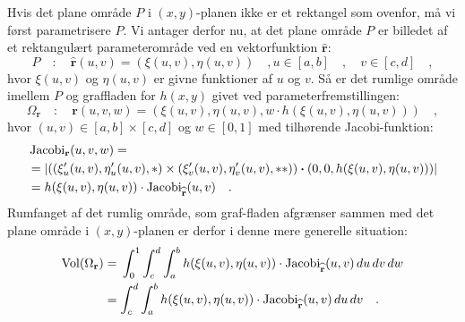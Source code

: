 \begin{example}
Hvis det plane område $P$ i $(x,y)$-planen ikke er et rektangel som ovenfor, må vi først pa\-ra\-me\-tri\-se\-re $P$. Vi antager derfor nu, at det plane område $P$ er billedet af
et rektangulært parameterområde ved en vektorfunktion $\widehat{\mathbf{r}}$:
\begin{equation}
P \quad : \quad \widehat{\mathbf{r}}(u,v) = (\xi(u,v), \eta(u,v)) \quad , u \in [a, b] \quad , \quad v \in [c, d] \quad ,
\end{equation}
hvor $\xi(u,v)$ og $\eta(u,v)$ er givne funktioner af $u$ og $v$. Så er det rumlige område imellem $P$ og graffladen for $h(x,y)$ givet ved parameterfremstillingen:
\begin{equation}
\Omega_{\mathbf{r}} \quad : \quad \mathbf{r}(u,v,w) = (\xi(u,v), \eta(u,v), w\cdot h(\xi(u,v),\eta(u,v))) \quad ,
\end{equation}
hvor $(u,v) \in [a,b]\times[c, d]$ og $w \in [0, 1]$
med tilhørende Jacobi-funktion:
\begin{equation}
\begin{aligned}
&\operatorname{Jacobi}_{\mathbf{r}}(u,v,w) = \\
& = |((\xi'_{u}(u,v),\eta'_{u}(u,v), *) \times (\xi'_{v}(u,v),\eta'_{v}(u,v), **)) \bm{\cdot} (0,0,h(\xi(u,v),\eta(u,v)))  |  \\
&= h(\xi(u,v),\eta(u,v))\cdot \operatorname{Jacobi}_{\widehat{\mathbf{r}}}(u,v) \quad.
\end{aligned}
\end{equation}
Rumfanget af det rumlig område, som graf-fladen afgrænser sammen med det plane område i $(x,y)$-planen er derfor i denne mere generelle situation:
\begin{equation}
\begin{aligned}
\operatorname{Vol}(\Omega_{\mathbf{r}}) &=
\, \int_{0}^{1}\int_{c}^{d} \int_{a}^{b} h(\xi(u,v),\eta(u,v))\cdot \operatorname{Jacobi}_{\widehat{\mathbf{r}}}(u,v)  \,du
\, dv \, dw \\
&= \int_{c}^{d} \int_{a}^{b} h(\xi(u,v),\eta(u,v))\cdot \operatorname{Jacobi}_{\widehat{\mathbf{r}}}(u,v)  \,du
\, dv \quad .
\end{aligned}
\end{equation}
\end{example}

